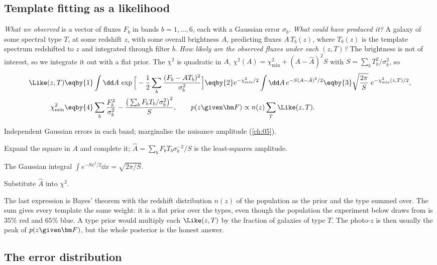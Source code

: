 \subsection{Template fitting as a likelihood}

\emph{What we observed} is a vector of fluxes $F_b$ in bands $b=1,\dots,6$, each with a Gaussian error $\sigma_b$. \emph{What could have produced it?} A galaxy of some spectral type $T$, at some redshift $z$, with some overall brightness $A$, predicting fluxes $A\,T_b(z)$, where $T_b(z)$ is the template spectrum redshifted to $z$ and integrated through filter $b$. \emph{How likely are the observed fluxes under each $(z,T)$?} The brightness is not of interest, so we integrate it out with a flat prior. The $\chi^2$ is quadratic in $A$, $\chi^2(A)=\chi^2_{\min}+(A-\hat A)^2S$ with $S=\sum_bT_b^2/\sigma_b^2$, so
\begin{align}
  \Like(z,T)
  &\eqby{1}\int\dd A\,\exp\Big[-\frac12\sum_b\frac{(F_b-AT_b)^2}{\sigma_b^2}\Big]
  \eqby{2}e^{-\chi^2_{\min}/2}\int\dd A\,e^{-S(A-\hat A)^2/2}
  \eqby{3}\sqrt{\frac{2\pi}{S}}\;e^{-\chi^2_{\min}(z,T)/2},\nonumber\\
  \chi^2_{\min}&\eqby{4}\sum_b\frac{F_b^2}{\sigma_b^2}-\frac{\big(\sum_bF_bT_b/\sigma_b^2\big)^2}{S},
  \qquad
  p(z\given\bm F)\propto n(z)\sum_T\Like(z,T).
  \label{T2b:eq:photoz-like}
\end{align}
\begin{explain}
  \item Independent Gaussian errors in each band; marginalise the nuisance amplitude (\cref{ch:05}).
  \item Expand the square in $A$ and complete it; $\hat A=\sum_bF_bT_b\sigma_b^{-2}/S$ is the least-squares amplitude.
  \item The Gaussian integral $\int e^{-Sx^2/2}\dd x=\sqrt{2\pi/S}$.
  \item Substitute $\hat A$ into $\chi^2$.
\end{explain}
The last expression is Bayes' theorem with the redshift distribution $n(z)$ of the population as the prior and the type summed over. The sum gives every template the same weight: it is a flat prior over the types, even though the population the experiment below draws from is $35\%$ red and $65\%$ blue. A type prior would multiply each $\Like(z,T)$ by the fraction of galaxies of type $T$. The photo-$z$ is then usually the peak of $p(z\given\bm F)$, but the whole posterior is the honest answer.

\subsection{The error distribution}

